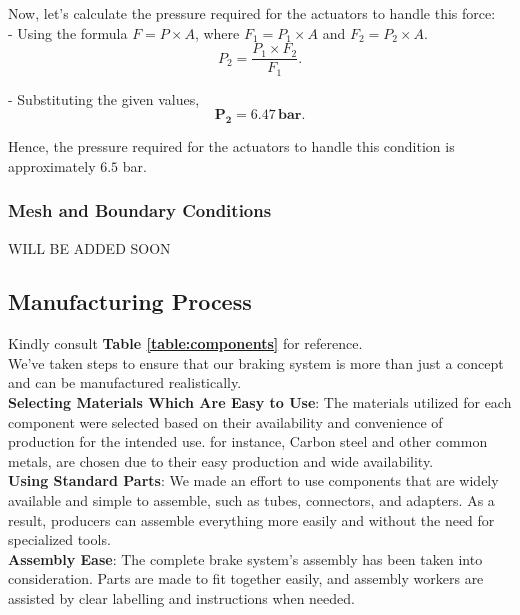 Now, let's calculate the pressure required for the actuators to handle this force: \\
 
- Using the formula $F = P \times A$, where $F_1 = P_1 \times A$ and $F_2 = P_2 \times A$.\\  
\[
P_2 = \frac{P_1 \times F_2}{F_1}.
\]  

- Substituting the given values, 
\begin{equation}
\mathbf{P_2} = \mathbf{6.47} \, \textbf{bar}.
\end{equation}

Hence, the pressure required for the actuators to handle this condition is approximately $6.5$ bar.
\subsubsection{Mesh and Boundary Conditions}
WILL BE ADDED SOON

\subsection{Manufacturing Process}
Kindly consult \textbf{Table \ref{table:components}} for reference.\\

\noindent
We've taken steps to ensure that our braking system is more than just a concept and can be manufactured realistically.\\

\noindent
\textbf{Selecting Materials Which Are Easy to Use}: The materials utilized for each component were selected based on their availability and convenience of production for the intended use. for instance, Carbon steel and other common metals, are chosen due to their easy production and wide availability.\\

\noindent
\textbf{Using Standard Parts}: We made an effort to use components that are widely available and simple to assemble, such as tubes, connectors, and adapters. As a result, producers can assemble everything more easily and without the need for specialized tools.\\ 

\noindent
\textbf{Assembly Ease}: The complete brake system's assembly has been taken into consideration. Parts are made to fit together easily, and assembly workers are assisted by clear labelling and instructions when needed.



